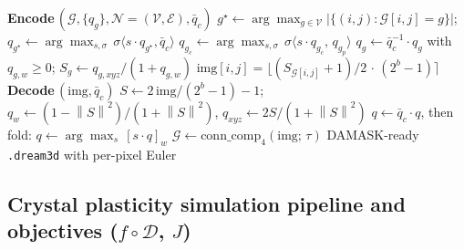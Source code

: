 \documentclass{article}
\newcommand{\Dec}{\mathcal{D}}
\newcommand{\norm}[1]{\left\lVert#1\right\rVert}
\begin{document}
\begin{algorithm}[t]
\caption{Orientation codec --- encode (Dream3D $\to$ image) and decode (image $\to$ Dream3D)}
\label{alg:codec}
\begin{algorithmic}[1]
\Statex \textbf{Encode}\,$(\mathcal{G}, \{q_g\}, \mathcal{N}{=}(\mathcal{V},\mathcal{E}), \bar{q}_c)$
\State $g^\star \gets \arg\max_{g \in \mathcal{V}} |\{(i,j):\mathcal{G}[i,j]{=}g\}|$; $q_{g^\star} \gets \arg\max_{s,\sigma}\, \sigma\langle s\cdot q_{g^\star},\bar{q}_c\rangle$
  \State $q_{g_c} \gets \arg\max_{s,\sigma}\, \sigma\langle s\cdot q_{g_c},\, q_{g_p}\rangle$
\EndFor
\State $q_g \gets \bar{q}_c^{-1}\cdot q_g$ with $q_{g,w}\!\ge\!0$; $S_g \gets q_{g,xyz}/(1+q_{g,w})$
\State \Return $\mathrm{img}[i,j] = \bigl\lfloor (S_{\mathcal{G}[i,j]}+1)/2\,\cdot\,(2^b{-}1) \bigr\rceil$
\Statex \textbf{Decode}\,$(\mathrm{img}, \bar{q}_c)$
\State $S \gets 2\,\mathrm{img}/(2^b{-}1) - 1$; $q_w \gets (1-\norm{S}^2)/(1+\norm{S}^2)$, $q_{xyz} \gets 2S/(1+\norm{S}^2)$
\State $q \gets \bar{q}_c \cdot q$, then fold: $q \gets \arg\max_{s}\,[s\cdot q]_w$
\State $\mathcal{G} \gets \mathrm{conn\_comp}_{4}(\mathrm{img};\,\tau)$
\State \Return DAMASK-ready \texttt{.dream3d} with per-pixel Euler
\end{algorithmic}
\end{algorithm}


\subsection{Crystal plasticity simulation pipeline and objectives ($f\circ\Dec$, $J$)}
\label{sec:pipeline}
\end{document}
